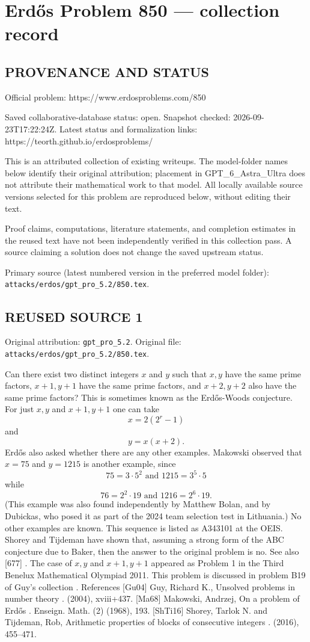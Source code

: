 \section*{Erd\H{o}s Problem 850 --- collection record}

\subsection*{PROVENANCE AND STATUS}
Official problem: https://www.erdosproblems.com/850

Saved collaborative-database status: open.
Snapshot checked: 2026-09-23T17:22:24Z.
Latest status and formalization links: https://teorth.github.io/erdosproblems/

This is an attributed collection of existing writeups. The model-folder names below identify their original attribution; placement in GPT\_6\_Astra\_Ultra does not attribute their mathematical work to that model. All locally available source versions selected for this problem are reproduced below, without editing their text.

Proof claims, computations, literature statements, and completion estimates in the reused text have not been independently verified in this collection pass. A source claiming a solution does not change the saved upstream status.

Primary source (latest numbered version in the preferred model folder): \texttt{attacks/erdos/gpt\_pro\_5.2/850.tex}.

\subsection*{REUSED SOURCE 1}
Original attribution: \texttt{gpt\_pro\_5.2}.
Original file: \texttt{attacks/erdos/gpt\_pro\_5.2/850.tex}.


Can there exist two distinct integers $x$ and $y$ such that $x,y$ have the same prime factors, $x+1,y+1$ have the same prime factors, and $x+2,y+2$ also have the same prime factors? This is sometimes known as the Erd\H{o}s-Woods conjecture. For just $x,y$ and $x+1,y+1$ one can take\[x=2(2^r-1)\]and\[y = x(x+2).\]Erd\H{o}s also asked whether there are any other examples. Makowski \cite{Ma68} observed that $x=75$ and $y=1215$ is another example, since\[75 = 3\cdot 5^2 \textrm{ and }1215 = 3^5\cdot 5\]while\[76 = 2^2\cdot 19\textrm{ and }1216 = 2^6\cdot 19.\](This example was also found independently by Matthew Bolan, and by Dubickas, who posed it as part of the 2024 team selection test in Lithuania.) No other examples are known. This sequence is listed as A343101 at the OEIS. Shorey and Tijdeman \cite{ShTi16} have shown that, assuming a strong form of the ABC conjecture due to Baker, then the answer to the original problem is no. See also [677] . The case of $x,y$ and $x+1,y+1$ appeared as Problem 1 in the Third Benelux Mathematical Olympiad 2011. This problem is discussed in problem B19 of Guy's collection \cite{Gu04}. References [Gu04] Guy, Richard K., Unsolved problems in number theory . (2004), xviii+437. [Ma68] Makowski, Andrzej, On a problem of {E}rd\H{o}s . Enseign. Math. (2) (1968), 193. [ShTi16] Shorey, Tarlok N. and Tijdeman, Rob, Arithmetic properties of blocks of consecutive integers . (2016), 455--471.

